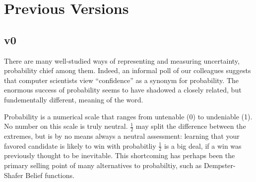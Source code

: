 \documentclass{article}
\begin{document}
\clearpage
\appendix
\section*{Previous Versions}
\subsection*{v0}

There are many well-studied ways of representing and measuring uncertainty,
probability chief among them. 
Indeed, an informal poll of our colleagues suggests that computer scientists view ``confidence'' as a synonym for probability. 
The enormous success of probability seems to have shadowed a closely related, but fundementally different, meaning of the word. 



Probability is a numerical scale that ranges from untenable (0) to undeniable (1). 
No number on this scale is truly neutral.
$\frac12$ may split the difference between the extremes, but is by no means always a neutral assessment: learning that your favored candidate is likely to win with probabitliy $\frac12$ is a big deal, if a win was previously thought to be inevitable. 
This shortcoming has perhaps been the primary selling point of many alternatives to probabiltiy, such as Dempster-Shafer Belief functions. 
\end{document}

